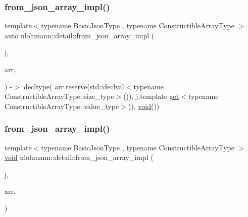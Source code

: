 \mbox{\label{namespacenlohmann_1_1detail_a464e1246f3df7edea79c3f81ab701edd}} 
\subsubsection{\texorpdfstring{from\_json\_array\_impl()}{from\_json\_array\_impl()}\hspace{0.1cm}{\footnotesize\ttfamily [3/4]}}
{\footnotesize\ttfamily template$<$typename Basic\+Json\+Type , typename Constructible\+Array\+Type $>$ \\
auto nlohmann\+::detail\+::from\+\_\+json\+\_\+array\+\_\+impl (\begin{DoxyParamCaption}\item[{const Basic\+Json\+Type \&}]{j,  }\item[{Constructible\+Array\+Type \&}]{arr,  }\item[{\mbox{\hyperlink{structnlohmann_1_1detail_1_1priority__tag}{priority\+\_\+tag}}$<$ 1 $>$}]{ }\end{DoxyParamCaption}) -\/$>$ decltype(
    arr.\+reserve(std\+::declval$<$typename Constructible\+Array\+Type\+::size\+\_\+type$>$()),
    j.\+template \mbox{\hyperlink{namespacenlohmann_1_1detail_acc422c11342b31368f610b6f96fcedc6}{get}}$<$typename Constructible\+Array\+Type\+::value\+\_\+type$>$(),
    \mbox{\hyperlink{namespacenlohmann_1_1detail_a59fca69799f6b9e366710cb9043aa77d}{void}}())
}

\mbox{\label{namespacenlohmann_1_1detail_a20cf21255e75cff1ffb0869c2c545e63}} 
\subsubsection{\texorpdfstring{from\_json\_array\_impl()}{from\_json\_array\_impl()}\hspace{0.1cm}{\footnotesize\ttfamily [4/4]}}
{\footnotesize\ttfamily template$<$typename Basic\+Json\+Type , typename Constructible\+Array\+Type $>$ \\
\mbox{\hyperlink{namespacenlohmann_1_1detail_a59fca69799f6b9e366710cb9043aa77d}{void}} nlohmann\+::detail\+::from\+\_\+json\+\_\+array\+\_\+impl (\begin{DoxyParamCaption}\item[{const Basic\+Json\+Type \&}]{j,  }\item[{Constructible\+Array\+Type \&}]{arr,  }\item[{\mbox{\hyperlink{structnlohmann_1_1detail_1_1priority__tag}{priority\+\_\+tag}}$<$ 0 $>$}]{ }\end{DoxyParamCaption})}

